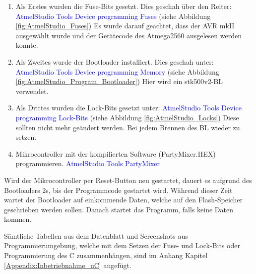 \begin{enumerate}
\item Als Erstes wurden die Fuse-Bits gesetzt. Dies geschah über den Reiter:\newline
\textcolor{blue}{AtmelStudio \textrightarrow Tools \textrightarrow Device programming \textrightarrow Fuses} (siehe Abbildung \ref{fig:AtmelStudio_Fuses}) \newline
Es wurde darauf geachtet, dass der AVR mkII ausgewählt wurde und der Gerätecode des Atmega2560 ausgelesen werden konnte.\newline

\item Als Zweites wurde der Bootloader installiert. Dies geschah unter:\newline
\textcolor{blue}{AtmelStudio \textrightarrow Tools \textrightarrow Device programming \textrightarrow Memory} (siehe Abbildung \ref{fig:AtmelStudio_Program_Bootloader}) \newline
Hier wird ein stk500v2-BL verwendet.\newline
\item Als Drittes wurden die Lock-Bits gesetzt unter:\newline
\textcolor{blue}{AtmelStudio \textrightarrow Tools \textrightarrow Device programming \textrightarrow Lock-Bits} (siehe Abbildung \ref{fig:AtmelStudio_Locks})\newline
Diese sollten nicht mehr geändert werden. Bei jedem Brennen des BL wieder zu setzen.\newline
\item Mikrocontroller mit der kompilierten Software (PartyMixer.HEX) programmieren.\newline
\textcolor{blue}{AtmelStudio \textrightarrow Tools \textrightarrow PartyMixer}\newline
\end{enumerate}


Wird der Mikrocontroller per Reset-Button neu gestartet, dauert es aufgrund des Bootloaders 2s, bis der Programmcode gestartet wird. Während dieser Zeit wartet der Bootloader auf einkommende Daten, welche auf den Flash-Speicher geschrieben werden sollen. Danach startet das Programm, falls keine Daten kommen.

Sämtliche Tabellen aus dem Datenblatt und Screenshots aus Programmierumgebung, welche mit dem Setzen der Fuse- und Lock-Bits oder Programmierung des \textmu C zusammenhängen, sind im Anhang Kapitel \ref{Appendix:Inbetriebnahme_uC} angefügt.